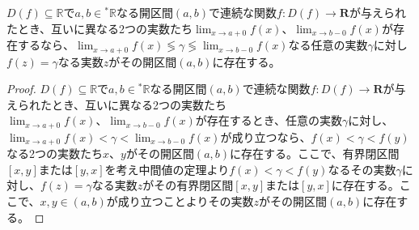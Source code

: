 \documentclass[dvipdfmx]{jsarticle}
\begin{document}
\begin{thm}\label{4.1.12.10}
$D(f) \subseteq \mathbb{R}$で$a,b \in{}^{*}\mathbb{R}$なる開区間$(a,b)$で連続な関数$f:D(f)\mathbf{\rightarrow R}$が与えられたとき、互いに異なる2つの実数たち$\lim_{x \rightarrow a + 0}{f(x)}、\lim_{x \rightarrow b - 0}{f(x)}$が存在するなら、$\lim_{x \rightarrow a + 0}{f(x)} \lessgtr \gamma \lessgtr \lim_{x \rightarrow b - 0}{f(x)}$なる任意の実数$\gamma$に対し$f(z) = \gamma$なる実数$z$がその開区間$(a,b)$に存在する。
\end{thm}
\begin{proof}
$D(f) \subseteq \mathbb{R}$で$a,b \in{}^{*}\mathbb{R}$なる開区間$(a,b)$で連続な関数$f:D(f)\mathbf{\rightarrow R}$が与えられたとき、互いに異なる2つの実数たち$\lim_{x \rightarrow a + 0}{f(x)}、\lim_{x \rightarrow b - 0}{f(x)}$が存在するとき、任意の実数$\gamma$に対し、$\lim_{x \rightarrow a + 0}{f(x)} < \gamma < \lim_{x \rightarrow b - 0}{f(x)}$が成り立つなら、$f(x) < \gamma < f(y)$なる2つの実数たち$x$、$y$がその開区間$(a,b)$に存在する。ここで、有界閉区間$[ x,y]$または$[ y,x]$を考え中間値の定理より$f(x) < \gamma < f(y)$なるその実数$\gamma$に対し、$f(z) = \gamma$なる実数$z$がその有界閉区間$[ x,y]$または$[ y,x]$に存在する。ここで、$x,y \in (a,b)$が成り立つことよりその実数$z$がその開区間$(a,b)$に存在する。
\end{proof}
\end{document}
